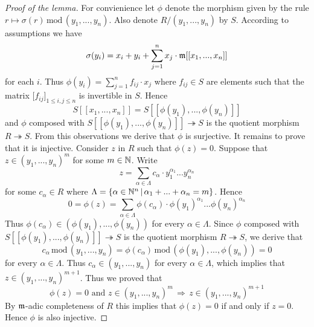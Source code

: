 \begin{proof}[Proof of the lemma]
For convienience let $\phi$ denote the morphism given by the rule $r\mapsto \sigma(r)\,\mathrm{mod}\,(y_1,...,y_n)$. Also denote $R/(y_1,...,y_n)$ by $S$. According to assumptions we have
$$\sigma(y_i) = x_i + y_i + \sum_{j=1}^nx_j\cdot \mathfrak{m}[[x_1,...,x_n]]$$
for each $i$. Thus $\phi(y_i) = \sum_{j=1}^nf_{ij}\cdot x_j$
where $f_{ij}\in S$ are elements such that the matrix $\big[f_{ij}\big]_{1\leq i,j\leq n}$ is invertible in $S$. Hence
$$S[[x_1,...,x_n]] = S[[\phi(y_1),...,\phi(y_n)]]$$
and $\phi$ composed with $S[[\phi(y_1),...,\phi(y_n)]] \twoheadrightarrow S$ is the quotient morphism $R \twoheadrightarrow S$. From this observations we derive that $\phi$ is surjective. It remains to prove that it is injective. Consider $z$ in $R$ such that $\phi(z) = 0$. Suppose that $z \in (y_1,...,y_n)^m$ for some $m\in {\mathbb N}$. Write
$$z = \sum_{\alpha \in \Lambda}c_{\alpha}\cdot y_1^{\alpha_1}...y_n^{\alpha_n}$$
for some $c_{\alpha}\in R$ where $\Lambda = \{\alpha \in {\mathbb N}^n\,|\,\alpha_1+...+\alpha_n = m\}$. Hence
$$0 = \phi(z) = \sum_{\alpha \in \Lambda}\phi(c_{\alpha})\cdot \phi(y_1)^{\alpha_1}...\phi(y_n)^{\alpha_n}$$
Thus $\phi(c_{\alpha}) \in \left(\phi(y_1),...,\phi(y_n)\right)$ for every $\alpha \in \Lambda$. Since $\phi$ composed with $S[[\phi(y_1),...,\phi(y_n)]] \twoheadrightarrow S$ is the quotient morphism $R \twoheadrightarrow S$, we derive that 
$$c_{\alpha}\,\mathrm{mod}\,(y_1,...,y_n) = \phi(c_{\alpha})\,\mathrm{mod}\,\left(\phi(y_1),...,\phi(y_n)\right) = 0$$
for every $\alpha \in \Lambda$. Thus $c_{\alpha}\in (y_1,...,y_n)$ for every $\alpha \in \Lambda$, which implies that $z \in (y_1,...,y_n)^{m+1}$. Thus we proved that 
$$\mbox{$\phi(z) = 0$ and $z \in (y_1,...,y_n)^m$}\,\Rightarrow\,z \in (y_1,...,y_n)^{m+1}$$
By $\mathfrak{m}$-adic completeness of $R$ this implies that $\phi(z) = 0$ if and only if $z = 0$. Hence $\phi$ is also injective.
\end{proof}


